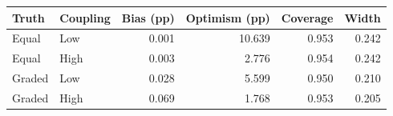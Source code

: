 \begin{tabular}{llrrrr}\toprule
Truth & Coupling & Bias (pp) & Optimism (pp) & Coverage & Width\\\midrule
Equal & Low & 0.001 & 10.639 & 0.953 & 0.242\\
Equal & High & 0.003 & 2.776 & 0.954 & 0.242\\
Graded & Low & 0.028 & 5.599 & 0.950 & 0.210\\
Graded & High & 0.069 & 1.768 & 0.953 & 0.205\\
\bottomrule\end{tabular}
